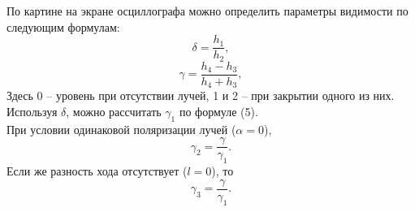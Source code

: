 \documentclass[a4paper,12pt]{article}
\begin{document}
По картине на экране осциллографа можно определить параметры видимости по следующим формулам:
\begin{equation}
\delta = \dfrac{h_1}{h_2},
\end{equation}
\begin{equation}
\gamma = \dfrac{h_4 - h_3}{h_4 + h_3},
\end{equation}
Здесь 0 -- уровень при отсутствии лучей, 1 и 2 -- при закрытии одного из них. Используя $\delta$, можно рассчитать $\gamma_1$ по формуле (5).\\ 
При условии одинаковой поляризации лучей ($\alpha = 0$),
\begin{equation}
\gamma_2 = \dfrac{\gamma}{\gamma_1}.
\end{equation}
Если же разность хода отсутствует ($l = 0$), то
\begin{equation}
\gamma_3 = \dfrac{\gamma}{\gamma_1}.
\end{equation}
\end{document}
